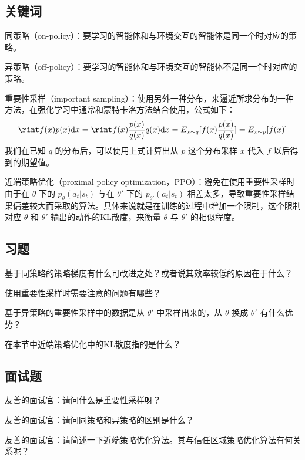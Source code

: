 \subsection{关键词}

同策略（on-policy）：要学习的智能体和与环境交互的智能体是同一个时对应的策略。

异策略（off-policy）：要学习的智能体和与环境交互的智能体不是同一个时对应的策略。

重要性采样（important sampling）：使用另外一种分布，来逼近所求分布的一种方法，在强化学习中通常和蒙特卡洛方法结合使用，公式如下：
\begin{equation}\nonumber
    \label{eq:}
    \rint f(x) p(x) \mathrm{d} x=\rint f(x) \frac{p(x)}{q(x)} q(x) \mathrm{d} x=E_{x \sim q}[f(x){\frac{p(x)}{q(x)}}]=E_{x \sim p}[f(x)]
\end{equation}
我们在已知 $q$ 的分布后，可以使用上式计算出从 $p$ 这个分布采样 $x$ 代入 $f$ 以后得到的期望值。

近端策略优化（proximal policy optimization，PPO）：避免在使用重要性采样时由于在 $\theta$ 下的 $p_{\theta}\left(a_{t} | s_{t}\right)$ 与在  $\theta '$ 下的 $p_{\theta'}\left(a_{t} | s_{t}\right)$ 相差太多，导致重要性采样结果偏差较大而采取的算法。具体来说就是在训练的过程中增加一个限制，这个限制对应 $\theta$ 和 $\theta'$ 输出的动作的KL散度，来衡量 $\theta$ 与 $\theta'$ 的相似程度。


\subsection{习题}

 基于同策略的策略梯度有什么可改进之处？或者说其效率较低的原因在于什么？

 使用重要性采样时需要注意的问题有哪些？

 基于异策略的重要性采样中的数据是从 $\theta'$ 中采样出来的，从 $\theta$ 换成 $\theta'$ 有什么优势？

 在本节中近端策略优化中的KL散度指的是什么？


\subsection{面试题}

 友善的面试官：请问什么是重要性采样呀？

 友善的面试官：请问同策略和异策略的区别是什么？

 友善的面试官：请简述一下近端策略优化算法。其与信任区域策略优化算法有何关系呢？
